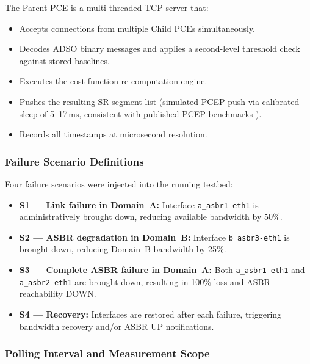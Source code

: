 \documentclass[conference]{IEEEtran}
\begin{document}
The Parent PCE is a multi-threaded TCP server that:
\begin{itemize}
  \item Accepts connections from multiple Child PCEs simultaneously.
  \item Decodes ADSO binary messages and applies a second-level
        threshold check against stored baselines.
  \item Executes the cost-function re-computation engine.
  \item Pushes the resulting SR segment list (simulated PCEP push
        via calibrated sleep of 5--17\,ms, consistent with published
        PCEP benchmarks \cite{b_pce_sr}).
  \item Records all timestamps at microsecond resolution.
\end{itemize}

\subsubsection{Failure Scenario Definitions}

Four failure scenarios were injected into the running testbed:

\begin{itemize}
  \item \textbf{S1 --- Link failure in Domain~A:} Interface
        \texttt{a\_asbr1-eth1} is administratively brought down,
        reducing available bandwidth by 50\%.
  \item \textbf{S2 --- ASBR degradation in Domain~B:} Interface
        \texttt{b\_asbr3-eth1} is brought down, reducing Domain~B
        bandwidth by 25\%.
  \item \textbf{S3 --- Complete ASBR failure in Domain~A:} Both
        \texttt{a\_asbr1-eth1} and \texttt{a\_asbr2-eth1} are brought
        down, resulting in 100\% loss and ASBR reachability DOWN.
  \item \textbf{S4 --- Recovery:} Interfaces are restored after each
        failure, triggering bandwidth recovery and/or ASBR UP
        notifications.
\end{itemize}

\subsubsection{Polling Interval and Measurement Scope}
\label{sec:polling}
\end{document}

